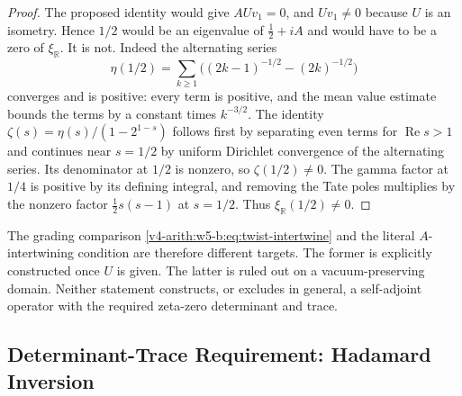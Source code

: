 \begin{proof}
The proposed identity would give $AUv_1=0$, and $Uv_1\ne0$
because $U$ is an isometry. Hence $1/2$ would be an eigenvalue
of $\tfrac12+iA$ and would have to be a zero of $\xi_{\mathbb R}$.
It is not. Indeed the alternating series
\[
 \eta(1/2)=\sum_{k\geq1}
       \bigl((2k-1)^{-1/2}-(2k)^{-1/2}\bigr)
\]
converges and is positive: every term is positive, and the mean
value estimate bounds the terms by a constant times $k^{-3/2}$.
The identity
$\zeta(s)=\eta(s)/(1-2^{1-s})$ follows first by separating even
terms for $\operatorname{Re}s>1$ and continues near $s=1/2$
by uniform Dirichlet convergence of the alternating series.
Its denominator at $1/2$ is nonzero, so $\zeta(1/2)\ne0$.
The gamma factor at $1/4$ is positive by its defining integral,
and removing the Tate poles multiplies by the nonzero factor
$\tfrac12s(s-1)$ at $s=1/2$. Thus $\xi_{\mathbb R}(1/2)\ne0$.
\end{proof}

The grading comparison \eqref{v4-arith:w5-b:eq:twist-intertwine}
and the literal $A$-intertwining condition are therefore different
targets. The former is explicitly constructed once $U$ is given.
The latter is ruled out on a vacuum-preserving domain. Neither
statement constructs, or excludes in general, a self-adjoint
operator with the required zeta-zero determinant and trace.

\subsection{Determinant-Trace Requirement: Hadamard Inversion}
\label{v4-arith:w5-b:twist:hadamard-inversion}

